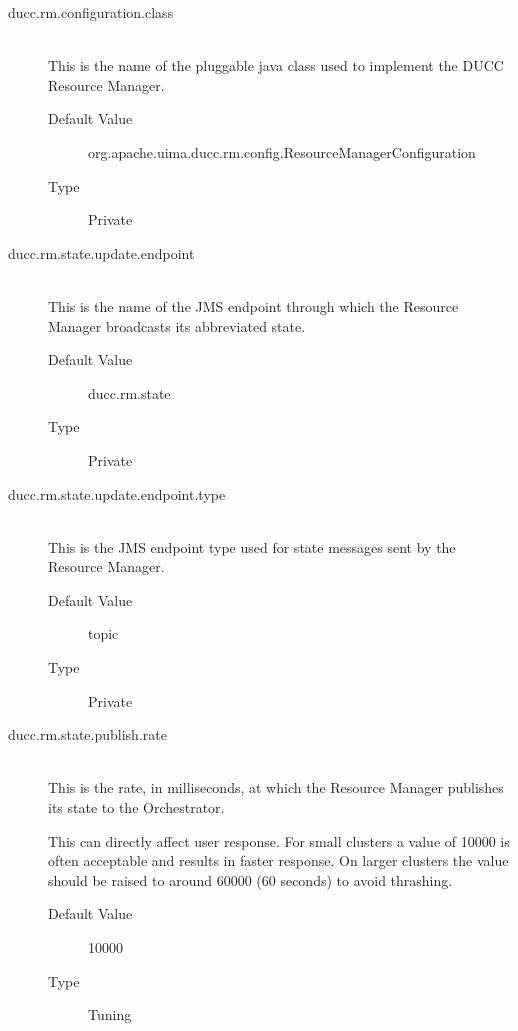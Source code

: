     \begin{description}
        \item[ducc.rm.configuration.class] \hfill \\
          This is the name of the pluggable java class used to implement the DUCC Resource 
          Manager. 
          \begin{description}
            \item[Default Value] org.apache.uima.ducc.rm.config.ResourceManagerConfiguration 
            \item[Type] Private 
          \end{description}
          
        \item[ducc.rm.state.update.endpoint] \hfill \\
          This is the name of the JMS endpoint through which the Resource Manager broadcasts its 
          abbreviated state. 
          \begin{description}
            \item[Default Value] ducc.rm.state              
            \item[Type] Private
          \end{description} 

        \item[ducc.rm.state.update.endpoint.type] \hfill \\
          This is the JMS endpoint type used for state messages sent by the Resource Manager.
          \begin{description}            
            \item[Default Value] topic 
            \item[Type] Private 
          \end{description}
          
        \item[ducc.rm.state.publish.rate] \hfill \\
          This is the rate, in milliseconds, at which the Resource Manager publishes its state to the 
          Orchestrator. 

          This can directly affect user response.  For small clusters a value of 10000 is often acceptable
          and results in faster response.  On larger clusters the value should be raised to around
          60000 (60 seconds) to avoid thrashing.
          \begin{description}
            \item[Default Value] 10000 
            \item[Type] Tuning
          \end{description} 
                    

\end{description}
